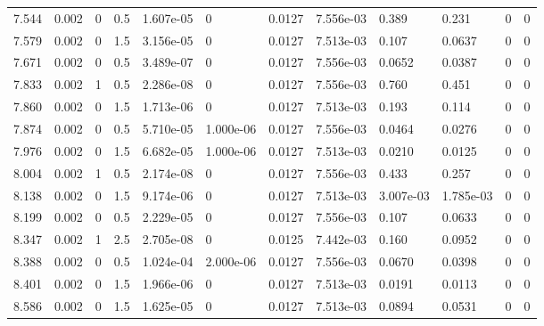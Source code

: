 \documentclass[preview]{standalone}
\begin{document}
{{{\begin{tabular}{L{1.2cm}C{1.2cm} C{0.3cm}C{0.5cm} C{1.4cm}C{1.4cm} C{1.4cm}C{1.4cm} C{1.6cm}C{1.6cm} C{1.6cm}C{1.6cm}}
  7.544  &  0.002  & 0     & 0.5 &  1.607e-05  & 0  &  0.0127&   7.556e-03& 0.389 & 0.231   &  0 & 0  \\ 
  7.579  &  0.002  & 0     & 1.5 &  3.156e-05  & 0  &  0.0127&   7.513e-03& 0.107 & 0.0637   &  0 & 0  \\ 
  7.671  &  0.002  & 0     & 0.5 &  3.489e-07  & 0  &  0.0127&   7.556e-03& 0.0652 & 0.0387   &  0 & 0  \\ 
  7.833  &  0.002  & 1     & 0.5 &  2.286e-08  & 0  &  0.0127&   7.556e-03& 0.760 & 0.451   &  0 & 0  \\ 
  7.860  &  0.002  & 0     & 1.5 &  1.713e-06  & 0  &  0.0127&   7.513e-03& 0.193 & 0.114   &  0 & 0  \\ 
  7.874  &  0.002  & 0     & 0.5 &  5.710e-05  & 1.000e-06  &  0.0127&   7.556e-03& 0.0464 & 0.0276   &  0 & 0  \\ 
  7.976  &  0.002  & 0     & 1.5 &  6.682e-05  & 1.000e-06  &  0.0127&   7.513e-03& 0.0210 & 0.0125   &  0 & 0  \\ 
  8.004  &  0.002  & 1     & 0.5 &  2.174e-08  & 0  &  0.0127&   7.556e-03& 0.433 & 0.257   &  0 & 0  \\ 
  8.138  &  0.002  & 0     & 1.5 &  9.174e-06  & 0  &  0.0127&   7.513e-03& 3.007e-03 & 1.785e-03   &  0 & 0  \\ 
  8.199  &  0.002  & 0     & 0.5 &  2.229e-05  & 0  &  0.0127&   7.556e-03& 0.107 & 0.0633   &  0 & 0  \\ 
  8.347  &  0.002  & 1     & 2.5 &  2.705e-08  & 0  &  0.0125&   7.442e-03& 0.160 & 0.0952   &  0 & 0  \\ 
  8.388  &  0.002  & 0     & 0.5 &  1.024e-04  & 2.000e-06  &  0.0127&   7.556e-03& 0.0670 & 0.0398   &  0 & 0  \\ 
  8.401  &  0.002  & 0     & 1.5 &  1.966e-06  & 0  &  0.0127&   7.513e-03& 0.0191 & 0.0113   &  0 & 0  \\ 
  8.586  &  0.002  & 0     & 1.5 &  1.625e-05  & 0  &  0.0127&   7.513e-03& 0.0894 & 0.0531   &  0 & 0  \\ 
\hline 
\end{tabular} 

}}}
\end{document}
